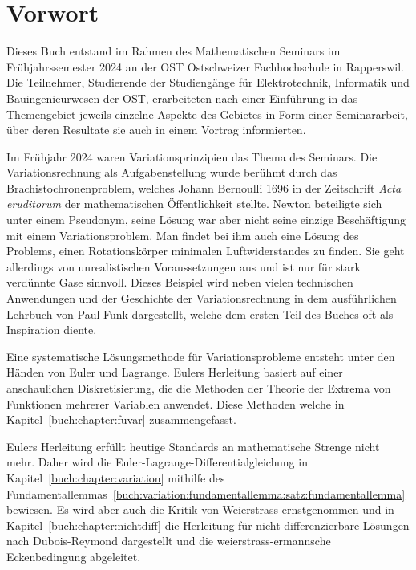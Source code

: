 %
%
%
\chapter*{Vorwort}


Dieses Buch entstand im Rahmen des Mathematischen Seminars
im Frühjahrssemester 2024 an der OST Ostschweizer Fachhochschule in Rapperswil.
Die Teilnehmer, Studierende der Studiengänge für Elektrotechnik, Informatik%
und Bauingenieurwesen
der OST, erarbeiteten nach einer Einführung in das Themengebiet jeweils
einzelne Aspekte des Gebietes in Form einer Seminararbeit, über
deren Resultate sie auch in einem Vortrag informierten. 

Im Frühjahr 2024 waren Variationsprinzipien das Thema des Seminars.
Die Variationsrechnung als Aufgabenstellung wurde berühmt durch
das Brachistochronenproblem, welches Johann Bernoulli 1696 in der
Zeitschrift {\em Acta eruditorum} der mathematischen Öffentlichkeit
stellte.
Newton beteiligte sich unter einem Pseudonym, seine Lösung war aber nicht
seine einzige Beschäftigung mit einem Variationsproblem.
Man findet bei ihm auch eine Lösung des Problems, einen Rotationskörper
minimalen Luftwiderstandes zu finden.
Sie geht allerdings von unrealistischen Voraussetzungen aus und ist
nur für stark verdünnte Gase sinnvoll.
Dieses Beispiel wird neben vielen technischen Anwendungen und 
der Geschichte der Variationsrechnung in dem ausführlichen Lehrbuch
\cite{buch:funk} von Paul Funk dargestellt, welche dem ersten Teil
des Buches oft als Inspiration diente.

Eine systematische Lösungsmethode für Variationsprobleme entsteht unter
den Händen von Euler und Lagrange.
Eulers Herleitung basiert auf einer anschaulichen Diskretisierung,
die die Methoden der Theorie der Extrema von Funktionen mehrerer
Variablen anwendet.
Diese Methoden welche in Kapitel~\ref{buch:chapter:fuvar}
zusammengefasst.

Eulers Herleitung erfüllt heutige Standards an mathematische
Strenge nicht mehr.
Daher wird die Euler-Lagrange-Differentialgleichung in
Kapitel~\ref{buch:chapter:variation} mithilfe des
Fundamentallemmas~\ref{buch:variation:fundamentallemma:satz:fundamentallemma}
bewiesen.
Es wird aber auch die Kritik von Weierstrass ernstgenommen und
in Kapitel~\ref{buch:chapter:nichtdiff} die
Herleitung für nicht differenzierbare Lösungen nach Dubois-Reymond
dargestellt und die weierstrass-ermannsche Eckenbedingung abgeleitet.

